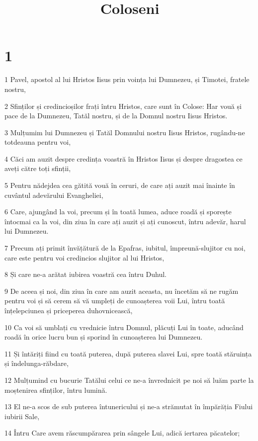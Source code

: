 

\title{Coloseni}


\chapter{1}

\par 1 Pavel, apostol al lui Hristos Iisus prin voința lui Dumnezeu, și Timotei, fratele nostru,
\par 2 Sfinților și credincioșilor frați întru Hristos, care sunt în Colose: Har vouă și pace de la Dumnezeu, Tatăl nostru, și de la Domnul nostru Iisus Hristos.
\par 3 Mulțumim lui Dumnezeu și Tatăl Domnului nostru Iisus Hristos, rugându-ne totdeauna pentru voi,
\par 4 Căci am auzit despre credința voastră în Hristos Iisus și despre dragostea ce aveți către toți sfinții,
\par 5 Pentru nădejdea cea gătită vouă în ceruri, de care ați auzit mai înainte în cuvântul adevărului Evangheliei,
\par 6 Care, ajungând la voi, precum și în toată lumea, aduce roadă și sporește întocmai ca la voi, din ziua în care ați auzit și ați cunoscut, întru adevăr, harul lui Dumnezeu.
\par 7 Precum ați primit învățătură de la Epafras, iubitul, împreună-slujitor cu noi, care este pentru voi credincios slujitor al lui Hristos,
\par 8 Și care ne-a arătat iubirea voastră cea întru Duhul.
\par 9 De aceea și noi, din ziua în care am auzit aceasta, nu încetăm să ne rugăm pentru voi și să cerem să vă umpleți de cunoașterea voii Lui, întru toată înțelepciunea și priceperea duhovnicească,
\par 10 Ca voi să umblați cu vrednicie întru Domnul, plăcuți Lui în toate, aducând roadă în orice lucru bun și sporind în cunoașterea lui Dumnezeu.
\par 11 Și întăriți fiind cu toată puterea, după puterea slavei Lui, spre toată stăruința și îndelunga-răbdare,
\par 12 Mulțumind cu bucurie Tatălui celui ce ne-a învrednicit pe noi să luăm parte la moștenirea sfinților, întru lumină.
\par 13 El ne-a scos de sub puterea întunericului și ne-a strămutat în împărăția Fiului iubirii Sale,
\par 14 Întru Care avem răscumpărarea prin sângele Lui, adică iertarea păcatelor;
